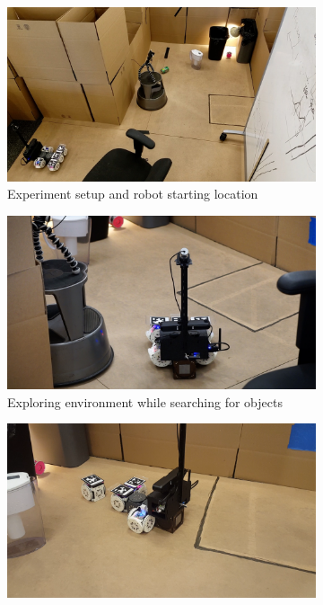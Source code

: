 \documentclass[conference]{IEEEtran}
\begin{document}
\begin{figure}[t]
      \centering
      \begin{subfigure}[t]{0.32\textwidth}
        \includegraphics[width=\textwidth]{images/overhead_starting.jpg}
        \caption{Experiment setup and robot starting location}
    \end{subfigure}
    \begin{subfigure}[t]{0.32\textwidth}
        \includegraphics[width=\textwidth]{images/exploration.jpg}
        \caption{Exploring environment while searching for objects}
    \end{subfigure}
    \begin{subfigure}[t]{0.32\textwidth}
        \includegraphics[width=\textwidth]{images/reconfiguration.png}

\end{subfigure}
\end{figure}
\end{document}
